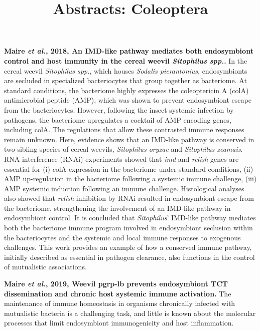 \documentclass[11pt]{article}
\title{Abstracts: Coleoptera}
\author{}
\date{}
\begin{document}
\begin{sloppypar}
\maketitle

\linenumbers

\textbf{Maire \textit{et al.}, 2018, An IMD-like pathway mediates both endosymbiont control and host immunity in the cereal weevil \textit{Sitophilus spp.}.} \newline
In the cereal weevil \textit{Sitophilus spp.}, which houses \textit{Sodalis pierantonius}, endosymbionts are secluded in specialized bacteriocytes that group together as bacteriome. 
At standard conditions, the bacteriome highly expresses the coleoptericin A (colA) antimicrobial peptide (AMP), which was shown to prevent endosymbiont escape from the bacteriocytes. 
However, following the insect systemic infection by pathogens, the bacteriome upregulates a cocktail of AMP encoding genes, including colA. 
The regulations that allow these contrasted immune responses remain unknown. 
Here, evidence shows that an IMD-like pathway is conserved in two sibling species of cereal weevils, \textit{Sitophilus oryzae} and \textit{Sitophilus zeamais}. 
RNA interference (RNAi) experiments showed that \textit{imd} and \textit{relish} genes are essential for 
(i) colA expression in the bacteriome under standard conditions, 
(ii) AMP up-regulation in the bacteriome following a systemic immune challenge, 
(iii) AMP systemic induction following an immune challenge. 
Histological analyses also showed that \textit{relish} inhibition by RNAi resulted in endosymbiont escape from the bacteriome, strengthening the involvement of an IMD-like pathway in endosymbiont control. 
It is concluded that \textit{Sitophilus}’ IMD-like pathway mediates both the bacteriome immune program involved in endosymbiont seclusion within the bacteriocytes and the systemic and local immune responses to exogenous challenges. 
This work provides an example of how a conserved immune pathway, initially described as essential in pathogen clearance, also functions in the control of mutualistic associations.
\par
\textbf{Maire \textit{et al.}, 2019, Weevil pgrp-lb prevents endosymbiont TCT dissemination and chronic host systemic immune activation.}
The maintenance of immune homeostasis in organisms chronically infected with mutualistic bacteria is a challenging task, and little is known about the molecular processes that limit endosymbiont immunogenicity and host inflammation. 

\end{sloppypar}
\end{document}
